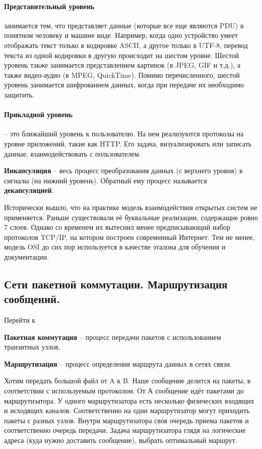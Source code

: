 \paragraph*{Представительный уровень}\label{b17:osi:lev6} занимается тем, что представляет данные (которые все еще являются PDU) в понятном человеку и машине виде. Например, когда одно устройство умеет отображать текст только в кодировке ASCII, а другое только в UTF-8, перевод текста из одной кодировки в другую происходит на шестом уровне.
Шестой уровень также занимается представлением картинок (в JPEG, GIF и т.д.), а также видео-аудио (в MPEG, QuickTime). Помимо перечисленного, шестой уровень занимается шифрованием данных, когда при передаче их необходимо защитить.

\paragraph*{Прикладной уровень}\label{b17:osi:lev7} -- это ближайший уровень к пользователю. На нем реализуются протоколы на уровне приложений, такие как HTTP.  Его задача, визуализировать или записать данные, взаимодействовать с пользователем.
\bigskip

\textbf{Инкапсуляция} -- весь процесс преобразования данных (с верхнего уровня) в сигналы (на нижний уровень). Обратный ему процесс называется \textbf{декапсуляцией}.

Исторически вышло, что на практике модель взаимодействия открытых систем не применяется. Раньше существовали её буквальные реализации, содержащие ровно 7 слоев. Однако со временем их вытеснил менее предписывающий набор протоколов TCP/IP, на котором построен современный Интернет. Тем не менее, модель OSI до сих пор используется в качестве эталона для обучения и документации.


\subsection*{Сети пакетной коммутации. Маршрутизация сообщений.}\label{b17:part2}

Перейти к~

\textbf{Пакетная коммутация} -- процесс передачи пакетов с использованием транзитных узлов.

\textbf{Маршрутизация} -- процесс определения маршрута данных в сетях связи.

Хотим передать большой файл от A к B. Наше сообщение делится на пакеты, в соответствии с используемым протоколом. От А сообщение идёт пакетами до маршрутизатора.
У одного маршрутизатора есть несколько физических входящих и исходящих каналов. Соответственно на один маршрутизатор могут приходить пакеты с разных узлов. Внутри маршрутизатора своя очередь приема пакетов и соответственно очередь передачи.
Задача маршрутизатора глядя на логические адреса (куда нужно доставить сообщение), выбрать оптимальный маршрут.

